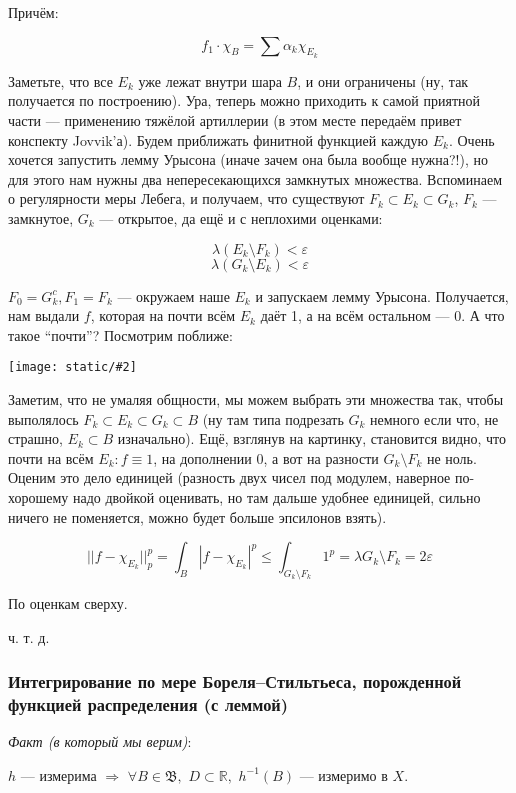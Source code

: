 \documentclass{article}
\def\dbl{\,\,}
\def\images#1#2{\begin{center}\texttt{[image: static/\#2]}\end{center}}
\begin{document}
Причём:

\[f_1 \cdot \chi_{B} = \sum \alpha_k \chi_{E_k}\]

Заметьте, что все $E_k$ уже лежат внутри шара $B$, и они ограничены (ну, так получается по построению). Ура, теперь можно приходить к самой приятной части --- применению тяжёлой артиллерии (в этом месте передаём привет конспекту Jovvik'а). Будем приближать финитной функцией каждую $E_k$. Очень хочется запустить лемму Урысона (иначе зачем она была вообще нужна?!), но для этого нам нужны два непересекающихся замкнутых множества. Вспоминаем о регулярности меры Лебега, и получаем, что существуют $F_k \subset E_k \subset G_k$, $F_k$ --- замкнутое, $G_k$ --- открытое, да ещё и с неплохими оценками:

\[\lambda (E_k \setminus F_k) < \varepsilon\]
\[\lambda (G_k \setminus E_k) < \varepsilon\]

$F_0 = G_k^c, F_1 = F_k$ --- окружаем наше $E_k$ и запускаем лемму Урысона. Получается, нам выдали $f$, которая на почти всём $E_k$ даёт 1, а на всём остальном --- 0. А что такое ``почти''? Посмотрим поближе:

\images{0.3}{pl_fin.jpg}

Заметим, что не умаляя общности, мы можем выбрать эти множества так, чтобы выполялось $F_k \subset E_k \subset G_k \subset B$ (ну там типа подрезать $G_k$ немного если что, не страшно, $E_k \subset B$ изначально). Ещё, взглянув на картинку, становится видно, что почти на всём $E_k: f \equiv 1$, на дополнении 0, а вот на разности $G_k \setminus F_k$ не ноль. Оценим это дело единицей (разность двух чисел под модулем, наверное по-хорошему надо двойкой оценивать, но там дальше удобнее единицей, сильно ничего не поменяется, можно будет больше эпсилонов взять).

\[||f - \chi_{E_k}||_p^p = \int_{B} |f - \chi_{E_k}|^p \le \int_{G_k \setminus F_k} 1^p = \lambda G_k \setminus F_k = 2 \varepsilon\]

По оценкам сверху.

ч. т. д. 

\subsubsection{Интегрирование по мере Бореля--Стильтьеса, порожденной функцией распределения (с леммой)}

\textit{Факт (в который мы верим)}:

$h$ --- измерима $\Rightarrow \dbl \forall B \in \mathfrak{B}, \dbl D \subset \mathbb{R}, \dbl h^{-1}(B)$ --- измеримо в $X$.
\end{document}
